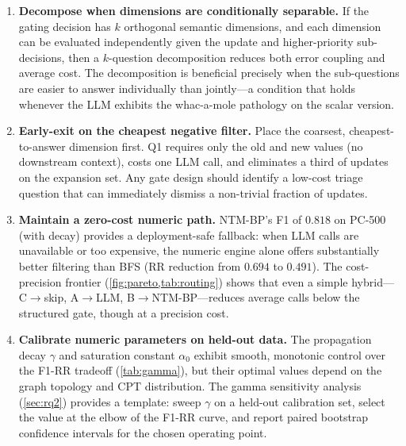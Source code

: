 \documentclass{article}
\theoremstyle{definition}
\begin{document}
\begin{enumerate}
\item \textbf{Decompose when dimensions are conditionally separable.}
  If the gating decision has $k$ orthogonal semantic dimensions, and
  each dimension can be evaluated independently given the update and
  higher-priority sub-decisions, then a $k$-question decomposition
  reduces both error coupling and average cost.  The decomposition is
  beneficial precisely when the sub-questions are easier to answer
  individually than jointly---a condition that holds whenever the LLM
  exhibits the whac-a-mole pathology on the scalar version.

\item \textbf{Early-exit on the cheapest negative filter.}  Place the
  coarsest, cheapest-to-answer dimension first.  Q1 requires only the
  old and new values (no downstream context), costs one LLM call, and
  eliminates a third of updates on the expansion set.  Any gate
  design should identify a low-cost triage question that can
  immediately dismiss a non-trivial fraction of updates.

\item \textbf{Maintain a zero-cost numeric path.}  NTM-BP's F1 of
  $0.818$ on PC-500 (with decay) provides a deployment-safe fallback:
  when LLM calls are unavailable or too expensive, the numeric engine
  alone offers substantially better filtering than BFS (RR reduction
  from $0.694$ to $0.491$).  The cost-precision frontier
  (\cref{fig:pareto,tab:routing}) shows that even a simple hybrid---
  C$\to$skip, A$\to$LLM, B$\to$NTM-BP---reduces average calls below
  the structured gate, though at a precision cost.

\item \textbf{Calibrate numeric parameters on held-out data.}  The
  propagation decay $\gamma$ and saturation constant $\alpha_0$ exhibit
  smooth, monotonic control over the F1-RR tradeoff (\cref{tab:gamma}),
  but their optimal values depend on the graph topology and CPT
  distribution.  The gamma sensitivity analysis
  (\cref{sec:rq2}) provides a template: sweep $\gamma$ on a
  held-out calibration set, select the value at the elbow of the
  F1-RR curve, and report paired bootstrap confidence intervals for
  the chosen operating point.


\end{enumerate}
\end{document}
